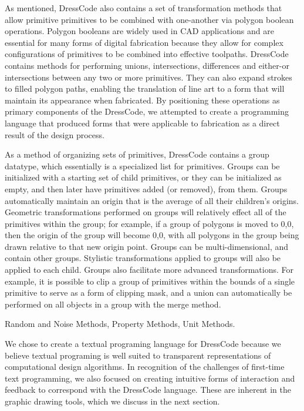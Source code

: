 \documentclass{sigchi}
\begin{document}
As mentioned, DressCode also contains a set of transformation methods that allow primitive primitives to be combined with one-another via polygon boolean operations. Polygon booleans are widely used in CAD applications and are essential for many forms of digital fabrication because they allow for complex configurations of primitives to be combined into effective toolpaths. DressCode contains methods for performing unions, intersections, differences and either-or intersections between any two or more primitives. They can also expand strokes to filled polygon paths, enabling the translation of line art to a form that will maintain its appearance when fabricated. By positioning these operations as primary components of the DressCode, we attempted to create a programming language that produced forms that were applicable to fabrication as a direct result of the design process. 

As a method of organizing sets of primitives, DressCode contains a group datatype, which essentially is a specialized list for primitives. Groups can be initialized with a starting set of child primitives, or they can be initialized as empty, and then later have primitives added (or removed), from them. Groups automatically maintain an origin that is the average of all their children's origins. Geometric transformations performed on groups will relatively effect all of the primitives within the group; for example, if a group of polygons is moved to 0,0, then the origin of the group will become 0,0, with all polygons in the group being drawn relative to that new origin point. Groups can be multi-dimensional, and contain other groups. Stylistic transformations applied to groups will also be applied to each child. Groups also facilitate more advanced transformations. For example, it is possible to clip a group of primitives within the bounds of a single primitive to serve as a form of clipping mask, and a union can automatically be performed on all objects in a group with the merge method.

Random and Noise Methods, Property Methods, Unit Methods.

We chose to create a textual programing language for DressCode because we believe textual programing is well suited to transparent representations of computational design algorithms. In recognition of the challenges of first-time text programming, we also focused on creating intuitive forms of interaction and feedback to correspond with the DressCode language. These are inherent in the graphic drawing tools, which we discuss in the next section.
 
\end{document}

